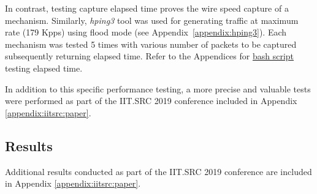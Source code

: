 \documentclass[12pt,a4paper,twoside]{report}
\begin{document}
			In contrast, testing capture elapsed time proves the wire speed capture of a mechanism. Similarly, \emph{hping3} tool was used for generating traffic at maximum rate (179 Kpps) using flood mode (see Appendix~\ref{appendix:hping3}). Each mechanism was tested 5 times with various number of packets to be captured subsequently returning elapsed time. Refer to the Appendices for \hyperref[appendix:script:timed]{bash script} testing elapsed time.\par
			In addition to this specific performance testing, a more precise and valuable tests were performed as part of the IIT.SRC 2019 conference included in Appendix \ref{appendix:iitsrc:paper}.
		\subsection{Results} \label{analysis:testing:results}
			Additional results conducted as part of the IIT.SRC 2019 conference are included in Appendix \ref{appendix:iitsrc:paper}.
\end{document}
